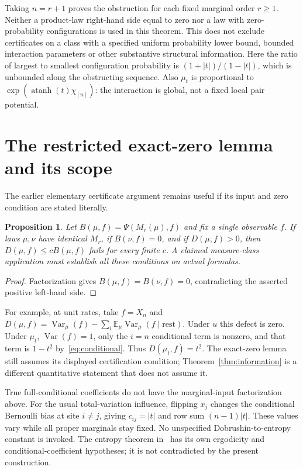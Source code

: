 \documentclass[11pt]{article}
\newtheorem{proposition}[theorem]{Proposition}
\newcommand{\E}{\mathbb E}
\newcommand{\Var}{\operatorname{Var}}
\begin{document}
Taking $n=r+1$ proves the obstruction for each fixed marginal order
$r\ge1$. Neither a product-law right-hand side equal to zero nor
a law with zero-probability configurations is used in this theorem.
This does not exclude certificates on a class with a specified
uniform probability lower bound, bounded interaction parameters or
other substantive structural information. Here the ratio of largest
to smallest configuration probability is $(1+|t|)/(1-|t|)$, which
is unbounded along the obstructing sequence. Also
$\mu_t$ is proportional to $\exp(\operatorname{atanh}(t)\chi_{[n]})$:
the interaction is global, not a fixed local pair potential.

\section{The restricted exact-zero lemma and its scope}
The earlier elementary certificate argument remains useful if its
input and zero condition are stated literally.
\begin{proposition}\label{prop:zero}
Let $B(\mu,f)=\Psi(M_r(\mu),f)$ and fix a single observable $f$.
If laws $\mu,\nu$ have identical $M_r$, if $B(\nu,f)=0$, and if
$D(\mu,f)>0$, then $D(\mu,f)\le cB(\mu,f)$ fails for every finite
$c$. A claimed measure-class application must establish all these
conditions on actual formulas.
\end{proposition}
\begin{proof}
Factorization gives $B(\mu,f)=B(\nu,f)=0$, contradicting the
asserted positive left-hand side.
\end{proof}
For example, at unit rates, take $f=X_n$ and
$D(\mu,f)=\Var_\mu(f)-\sum_i\E_\mu\Var_\mu(f\mid\mathrm{rest})$.
Under $u$ this defect is zero. Under $\mu_t$, $\Var(f)=1$,
only the $i=n$ conditional term is nonzero, and that term is
$1-t^2$ by~\eqref{eq:conditional}. Thus $D(\mu_t,f)=t^2$.
The exact-zero lemma still assumes its displayed certification
condition; Theorem~\ref{thm:information} is a different quantitative
statement that does not assume it.

True full-conditional coefficients do not have the marginal-input
factorization above. For the usual total-variation influence, flipping
$x_j$ changes the conditional Bernoulli bias at site $i\ne j$,
giving $c_{ij}=|t|$ and row sum $(n-1)|t|$. These values vary while
all proper marginals stay fixed. No unspecified Dobrushin-to-entropy
constant is invoked. The entropy theorem in~\cite[Theorem~2.1]{CMT}
has its own ergodicity and conditional-coefficient hypotheses;
it is not contradicted by the present construction.
\end{document}

